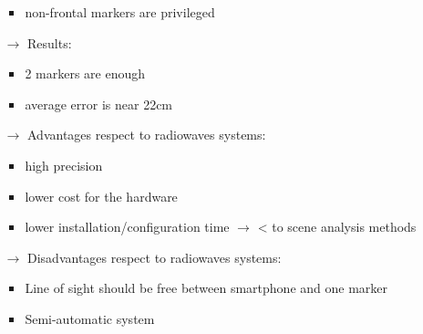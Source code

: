 \begin{itemize}
\begin{itemize}
\begin{itemize}
            \item non-frontal markers are privileged
        \end{itemize}
        \item[$\rightarrow$] Results:
        \begin{itemize}
            \item 2 markers are enough
            \item average error is near 22cm
        \end{itemize}
        \item[$\rightarrow$] Advantages respect to radiowaves systems:
        \begin{itemize}
            \item high precision
            \item lower cost for the hardware
            \item lower installation/configuration time $\rightarrow$ < to
            scene analysis methods
        \end{itemize}
        \item[$\rightarrow$] Disadvantages respect to radiowaves systems:
        \begin{itemize}
            \item Line of sight should be free between smartphone and one marker
            \item Semi-automatic system
        \end{itemize}
    \end{itemize}
\end{itemize}